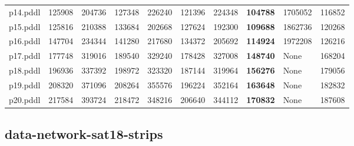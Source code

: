 \documentclass{article}
\begin{document}
\begin{tabular}{@{}lrrrrrrrrr@{}}
p14.pddl & 125908 & 204736 & 127348 & 226240 & 121396 & 224348 & \textbf{104788} & 1705052 & 116852 \\
p15.pddl & 125816 & 210388 & 133684 & 202668 & 127624 & 192300 & \textbf{109688} & 1862736 & 120268 \\
p16.pddl & 147704 & 234344 & 141280 & 217680 & 134372 & 205692 & \textbf{114924} & 1972208 & 126216 \\
p17.pddl & 177748 & 319016 & 189540 & 329240 & 178428 & 327008 & \textbf{148740} & \multicolumn{1}{|l|}{None} & 168204 \\
p18.pddl & 196936 & 337392 & 198972 & 323320 & 187144 & 319964 & \textbf{156276} & \multicolumn{1}{|l|}{None} & 179056 \\
p19.pddl & 208320 & 371096 & 208264 & 355576 & 196224 & 352164 & \textbf{163648} & \multicolumn{1}{|l|}{None} & 182832 \\
p20.pddl & 217584 & 393724 & 218472 & 348216 & 206640 & 344112 & \textbf{170832} & \multicolumn{1}{|l|}{None} & 187608 \\
\end{tabular}

\hypertarget{search_start_memory-data-network-sat18-strips}{}
\subsection*{data-network-sat18-strips}
\end{document}
